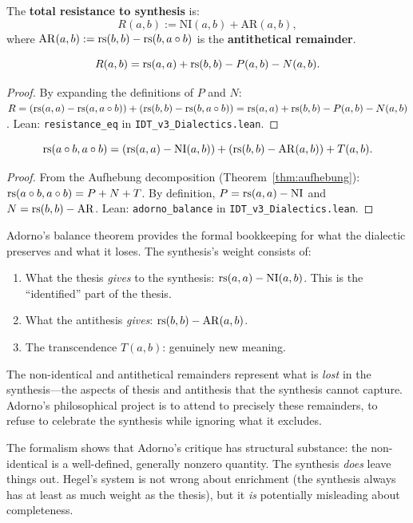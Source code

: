\begin{definition}
\label{def:resistance}
The \textbf{total resistance to synthesis} is:
\[
R(a, b) := \mathrm{NI}(a, b) + \mathrm{AR}(a, b),
\]
where $\mathrm{AR}(a,b) := \mathrm{rs}(b,b) - \mathrm{rs}(b, a \circ b)$ is the
\textbf{antithetical remainder}.
\end{definition}

\begin{theorem}
\label{thm:resistance}
\[
R(a, b) = \mathrm{rs}(a, a) + \mathrm{rs}(b, b) - P(a, b) - N(a, b).
\]
\end{theorem}

\begin{proof}
By expanding the definitions of $P$ and $N$:
$R = (\mathrm{rs}(a,a) - \mathrm{rs}(a, a \circ b)) + (\mathrm{rs}(b,b) - \mathrm{rs}(b, a \circ b)) = \mathrm{rs}(a,a) + \mathrm{rs}(b,b) - P(a,b) - N(a,b)$.
Lean: \texttt{resistance\_eq} in \texttt{IDT\_v3\_Dialectics.lean}.
\end{proof}

\begin{theorem}
\label{thm:adorno-balance}
\[
\mathrm{rs}(a \circ b, a \circ b) =
(\mathrm{rs}(a,a) - \mathrm{NI}(a,b)) + (\mathrm{rs}(b,b) - \mathrm{AR}(a,b)) + T(a,b).
\]
\end{theorem}

\begin{proof}
From the Aufhebung decomposition (Theorem~\ref{thm:aufhebung}):
$\mathrm{rs}(a \circ b, a \circ b) = P + N + T$.
By definition, $P = \mathrm{rs}(a,a) - \mathrm{NI}$ and $N = \mathrm{rs}(b,b) - \mathrm{AR}$.
Lean: \texttt{adorno\_balance} in \texttt{IDT\_v3\_Dialectics.lean}.
\end{proof}

\begin{interpretation}
\label{interp:adorno-balance}
Adorno's balance theorem provides the formal bookkeeping for what the
dialectic preserves and what it loses. The synthesis's weight consists of:
\begin{enumerate}
\item What the thesis \emph{gives} to the synthesis:
$\mathrm{rs}(a,a) - \mathrm{NI}(a,b)$. This is the ``identified'' part of the thesis.
\item What the antithesis \emph{gives}: $\mathrm{rs}(b,b) - \mathrm{AR}(a,b)$.
\item The transcendence $T(a,b)$: genuinely new meaning.
\end{enumerate}
The non-identical and antithetical remainders represent what is \emph{lost}
in the synthesis---the aspects of thesis and antithesis that the synthesis
cannot capture. Adorno's philosophical project is to attend to precisely
these remainders, to refuse to celebrate the synthesis while ignoring what
it excludes.

The formalism shows that Adorno's critique has structural substance: the
non-identical is a well-defined, generally nonzero quantity. The synthesis
\emph{does} leave things out. Hegel's system is not wrong about enrichment
(the synthesis always has at least as much weight as the thesis), but it
\emph{is} potentially misleading about completeness.
\end{interpretation}

